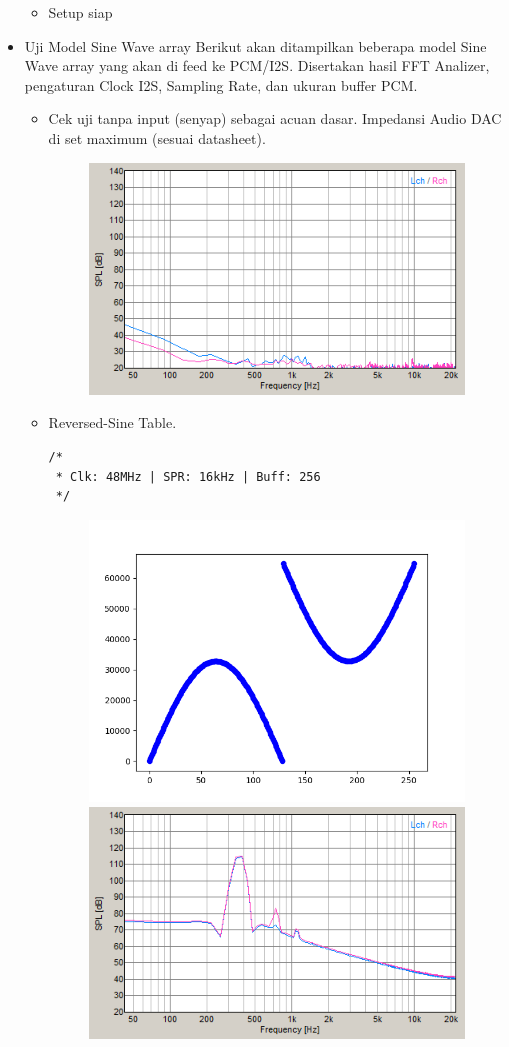 \documentclass[12pt,]{article}
\begin{document}
\begin{itemize}
\begin{itemize}
			\item Setup siap
		\end{itemize}
		
		\item Uji Model Sine Wave array
		Berikut akan ditampilkan beberapa model Sine Wave array yang akan di feed ke PCM/I2S.
		Disertakan hasil FFT Analizer, pengaturan Clock I2S, Sampling Rate, dan ukuran buffer PCM.   
		
		\begin{itemize}
			\item Cek uji tanpa input (senyap) sebagai acuan dasar.
			Impedansi Audio DAC di set maximum (sesuai datasheet).
			\begin{figure}[H]
				\centering
				\includegraphics[width=0.5\linewidth]{result/BaseZero}
			\end{figure}
		
			\newpage
			\item Reversed-Sine Table.
			\begin{verbatim}
/*
 * Clk: 48MHz | SPR: 16kHz | Buff: 256
 */	
			\end{verbatim}
			\begin{figure}[H]
				\centering
				\includegraphics[width=0.45\linewidth]{result/rev_sine_table}
				\includegraphics[width=0.45\linewidth]{result/tableMax256}
			\end{figure}
		

\end{itemize}
\end{itemize}
\end{document}
